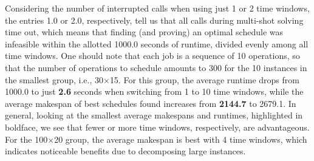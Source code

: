 \documentclass[runningheads]{llncs}
\begin{document}
%
Considering the number of interrupted calls when using just 1 or 2 time windows,
the entries 1.0 or 2.0, respectively, tell us that all calls during multi-shot
solving time out, which means that finding (and proving) an optimal schedule was infeasible
within the allotted 1000.0 seconds of runtime, divided evenly among all time windows.
One should note that each job is a sequence of 10 operations, so that the number of
operations to schedule amounts to 300 for the 10 instances in the smallest group, i.e., 30$\times$15.
For this group,
the average runtime drops from 1000.0 to just \textbf{2.6} seconds when switching from
1 to 10 time windows,
while the average makespan of best schedules found increases from \textbf{2144.7} to 2679.1.
In general, looking at the smallest average makespans and runtimes, highlighted in boldface,
we see that fewer or more time windows, respectively, are advantageous.
For the 100$\times$20 group, %
the average makespan is best with 4 time windows, which indicates noticeable benefits due to
decomposing large instances.
\end{document}
